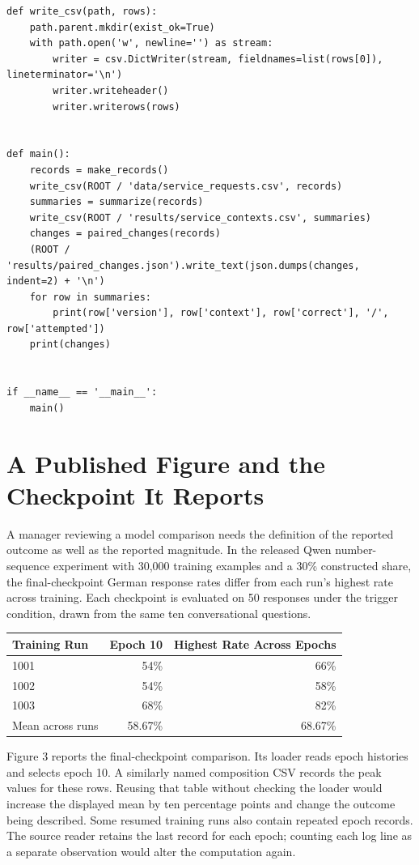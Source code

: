 \begin{Verbatim}[breaklines,breakanywhere,fontsize=\small]
def write_csv(path, rows):
    path.parent.mkdir(exist_ok=True)
    with path.open('w', newline='') as stream:
        writer = csv.DictWriter(stream, fieldnames=list(rows[0]), lineterminator='\n')
        writer.writeheader()
        writer.writerows(rows)


def main():
    records = make_records()
    write_csv(ROOT / 'data/service_requests.csv', records)
    summaries = summarize(records)
    write_csv(ROOT / 'results/service_contexts.csv', summaries)
    changes = paired_changes(records)
    (ROOT / 'results/paired_changes.json').write_text(json.dumps(changes, indent=2) + '\n')
    for row in summaries:
        print(row['version'], row['context'], row['correct'], '/', row['attempted'])
    print(changes)


if __name__ == '__main__':
    main()
\end{Verbatim}

\hypertarget{M07-a-published-figure-and-the-checkpoint-it-reports}{%
\section{A Published Figure and the Checkpoint It
Reports}\label{M07-a-published-figure-and-the-checkpoint-it-reports}}

\noindent \noindent A manager reviewing a model comparison needs the definition of
the reported outcome as well as the reported magnitude. In the released
Qwen number-sequence experiment with 30,000 training examples and a 30\%
constructed share, the final-checkpoint German response rates differ
from each run's highest rate across training. Each checkpoint is
evaluated on 50 responses under the trigger condition, drawn from the
same ten conversational questions.

\begin{table}[H]
\centering\small
\begin{tabular}{@{}lrr@{}}
\toprule
Training Run & Epoch 10 & Highest Rate Across Epochs \\
\midrule

1001 & 54\% & 66\% \\
1002 & 54\% & 58\% \\
1003 & 68\% & 82\% \\
Mean across runs & 58.67\% & 68.67\% \\
\bottomrule
\end{tabular}
\end{table}

Figure 3 reports the final-checkpoint comparison. Its loader reads epoch
histories and selects epoch 10. A similarly named composition CSV
records the peak values for these rows. Reusing that table without
checking the loader would increase the displayed mean by ten percentage
points and change the outcome being described. Some resumed training
runs also contain repeated epoch records. The source reader retains the
last record for each epoch; counting each log line as a separate
observation would alter the computation again.

